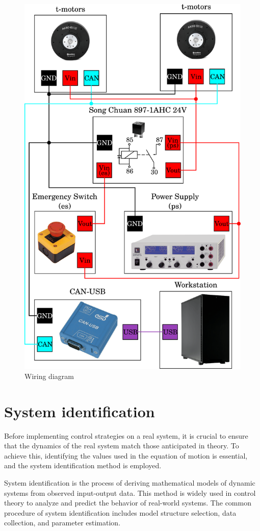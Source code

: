\begin{figure}[H]
    \centering
    \includegraphics[width=0.7\linewidth]{figures/hardware_setup/wiring-diagram.png}
    \caption{Wiring diagram\cite{2023_ram_wiebe_double_pendulum}}
    \label{fig:wiring diagram}
\end{figure}

\section{System identification}
Before implementing control strategies on a real system, it is crucial to ensure that the dynamics of the real system match those anticipated in theory. To achieve this, identifying the values used in the equation of motion is essential, and the system identification method is employed.

System identification is the process of deriving mathematical models of dynamic systems from observed input-output data. This method is widely used in control theory to analyze and predict the behavior of real-world systems. The common procedure of system identification includes model structure selection, data collection, and parameter estimation.

